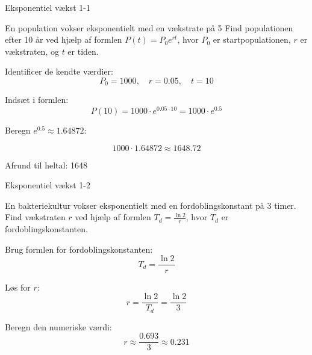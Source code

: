 \documentclass{article}
\begin{document}

\tableofcontents
\newpage

\begin{exercise}{Eksponentiel vækst 1-1}

En population vokser eksponentielt med en vækstrate på 5%
Find populationen efter 10 år ved hjælp af formlen $P(t) = P_0 e^{rt}$, hvor $P_0$ er startpopulationen, $r$ er vækstraten, og $t$ er tiden.


\hint

Identificer de kendte værdier:
\[
P_0 = 1000, \quad r = 0.05, \quad t = 10
\]

\hint

Indsæt i formlen:
\[
P(10) = 1000 \cdot e^{0.05 \cdot 10} = 1000 \cdot e^{0.5}
\]

\hint

Beregn $e^{0.5} \approx 1.64872$:

\hint
\[
1000 \cdot 1.64872 \approx 1648.72
\]

\hint

Afrund til heltal: 1648

\end{exercise}

\newpage

\begin{exercise}{Eksponentiel vækst 1-2}

En bakteriekultur vokser eksponentielt med en fordoblingskonstant på 3 timer. 
Find vækstraten $r$ ved hjælp af formlen $T_d = \frac{\ln 2}{r}$, hvor $T_d$ er fordoblingskonstanten.


\hint

Brug formlen for fordoblingskonstanten:
\[
T_d = \frac{\ln 2}{r}
\]

\hint

Løs for $r$:
\[
r = \frac{\ln 2}{T_d} = \frac{\ln 2}{3}
\]

\hint

Beregn den numeriske værdi:
\[
r \approx \frac{0.693}{3} \approx 0.231
\]

\end{exercise}

\newpage
\end{document}
